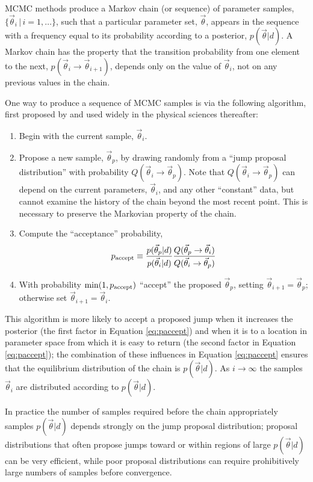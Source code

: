 \documentclass[preprint]{aastex}
\newcommand{\vtheta}{\vec{\theta}}
\begin{document}
MCMC methods produce a Markov chain (or sequence) of parameter
samples, $\{ \vtheta_i \, | \, i = 1, \ldots \}$, such that a particular
parameter set, $\vtheta$, appears in the sequence with a frequency
equal to its probability according to a posterior, $p(\vtheta|d)$.  A
Markov chain has the property that the transition probability from one
element to the next, $p(\vtheta_i \to \vtheta_{i+1})$, depends only on
the value of $\vtheta_i$, not on any previous values in the chain.

One way to produce a sequence of MCMC samples is via the following
algorithm, first proposed by \citet{Metropolis1953} and used widely in
the physical sciences thereafter:
\begin{enumerate}
  \item Begin with the current sample, $\vtheta_i$.
  \item Propose a new sample, $\vtheta_p$, by drawing randomly from a
    ``jump proposal distribution'' with probability $Q(\vtheta_i \to
    \vtheta_p)$.  Note that $Q(\vtheta_i \to \vtheta_p)$ can depend on
    the current parameters, $\vtheta_i$, and any other ``constant''
    data, but cannot examine the history of the chain beyond the most
    recent point.  This is necessary to preserve the Markovian
    property of the chain.
  \item Compute the ``acceptance'' probability,
    \begin{equation}
      \label{eq:paccept}
      p_{\textnormal{accept}} \equiv
      \frac{p(\vtheta_p|d)}{p(\vtheta_i|d)} \frac{Q(\vtheta_p \to
        \vtheta_i)}{Q(\vtheta_i \to \vtheta_p)}
    \end{equation}
  \item With probability $\min(1,p_{\textnormal{accept}})$ ``accept''
    the proposed $\vtheta_p$, setting $\vtheta_{i+1} = \vtheta_p$;
    otherwise set $\vtheta_{i+1} = \vtheta_i$.
\end{enumerate}
This algorithm is more likely to accept a proposed jump when it
increases the posterior (the first factor in Equation
\eqref{eq:paccept}) and when it is to a location in parameter space
from which it is easy to return (the second factor in Equation
\eqref{eq:paccept}); the combination of these influences in Equation
\eqref{eq:paccept} ensures that the equilibrium distribution of the
chain is $p(\vtheta|d)$.  As $i \to \infty$ the samples $\vtheta_i$
are distributed according to $p(\vtheta|d)$.  

In practice the number of samples required before the chain
appropriately samples $p(\vtheta|d)$ depends strongly on the jump
proposal distribution; proposal distributions that often propose jumps
toward or within regions of large $p(\vtheta|d)$ can be very
efficient, while poor proposal distributions can require prohibitively
large numbers of samples before convergence.  
\end{document}
